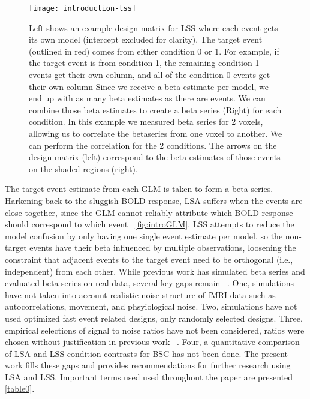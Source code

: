 \documentclass[10pt,letterpaper]{article}
\begin{document}
\begin{figure}[H]
  \centering
  \texttt{[image: introduction-lss]}
  \caption{
    Left shows an example design matrix for LSS where each event gets its own model
    (intercept excluded for clarity).
    The target event (outlined in red) comes from either condition 0 or 1.
    For example, if the target event is from condition 1, the remaining condition 1 events
    get their own column, and all of the condition 0 events get their own column
    Since we receive a beta estimate per model, we end up with as many beta estimates as there
    are events.
    We can combine those beta estimates to create a beta series (Right) for each condition.
    In this example we measured beta series for 2 voxels, allowing us to
    correlate the betaseries from one voxel to another.
    We can perform the correlation for the 2 conditions.
    The arrows on the design matrix (left) correspond to the beta estimates of those events
    on the shaded regions (right).
  }
  \label{fig:introlss}
\end{figure}

The target event estimate from each GLM is taken to form a beta series.
Harkening back to the sluggish BOLD response, LSA suffers when the events are close together,
since the GLM cannot reliably attribute which BOLD response should correspond to which event ~\ref{fig:introGLM}.
LSS attempts to reduce the model confusion by only having one single event estimate per model,
so the non-target events have their beta influenced by multiple observations, loosening the
constraint that adjacent events to the target event need to be orthogonal (i.e., independent) from each other.
While previous work has simulated beta series and evaluated beta series on real data,
several key gaps remain ~\cite{Mumford2014a,Mumford2012,Turner2012a,Abdulrahman2016,Cisler2012,Arco2018}.
One, simulations have not taken into account realistic noise structure of fMRI data such as autocorrelations, movement, and phsyiological noise.
Two, simulations have not used optimized fast event related designs, only randomly selected designs. 
Three, empirical selections of signal to noise ratios have not been considered,
ratios were chosen without justification in previous work ~\cite{Abdulrahman2016,Mumford2012}.
Four, a quantitative comparison of LSA and LSS condition contrasts for BSC has not been done.
The present work fills these gaps and provides recommendations for further research
using LSA and LSS.
Important terms used used throughout the paper are presented \ref{table0}.
\end{document}
